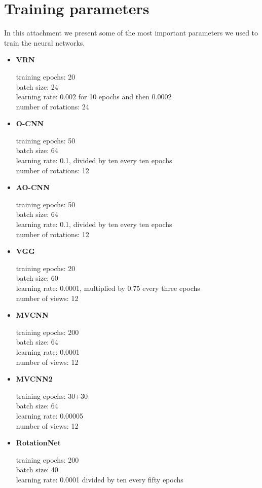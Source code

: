 \appendix

\chapter{Training parameters}
\label{Attachment:params}
In this attachment we present some of the most important parameters we used to train the neural networks.

\def\myitem #1#2{
	\item { \textbf{#1} \par #2
	}
}

\begin{itemize}
	\myitem{VRN}{
	training epochs: 20\\
	batch size: 24\\
	learning rate: 0.002 for 10 epochs and then 0.0002\\
	number of rotations: 24\\}
\myitem{O-CNN}{
	training epochs: 50\\
	batch size: 64\\
	learning rate: 0.1, divided by ten every ten epochs\\
	number of rotations: 12\\}
\myitem{AO-CNN}{
	training epochs: 50\\
	batch size: 64\\
	learning rate: 0.1, divided by ten every ten epochs\\
	number of rotations: 12\\}
\myitem{VGG}{
	training epochs: 20\\
	batch size: 60\\
	learning rate: 0.0001, multiplied by 0.75 every three epochs\\
	number of views: 12\\}
\myitem{MVCNN}{
	training epochs: 200\\
	batch size: 64\\
	learning rate: 0.0001\\
	number of views: 12\\}
\myitem{MVCNN2}{
	training epochs: 30+30\\
	batch size: 64\\
	learning rate: 0.00005\\
	number of views: 12\\}
\myitem{RotationNet}{
	training epochs: 200\\
	batch size: 40\\
	learning rate: 0.0001 divided by ten every fifty epochs\\
}
\end{itemize}
